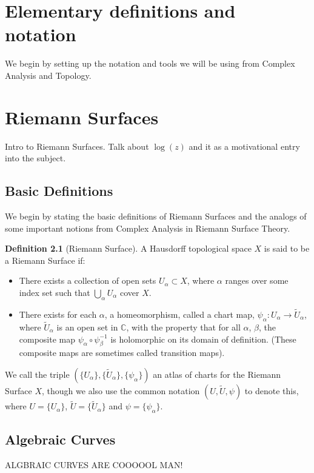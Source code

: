 \documentclass[11pt]{report}
\theoremstyle{definition}
\newtheorem{defn}[thm]{Definition}
\begin{document}
\chapter{Elementary definitions and notation}
We begin by setting up the notation and tools we will be using from Complex Analysis and Topology.

\chapter{Riemann Surfaces}

Intro to Riemann Surfaces. Talk about $\log(z)$ and it as a motivational entry into the subject.


\section{Basic Definitions}\label{bdefns}

We begin by stating the basic definitions of Riemann Surfaces and the 
analogs of some important notions from Complex Analysis in Riemann Surface
Theory.

\begin{defn}[Riemann Surface]\label{rsdefn}
A Hausdorff topological space $X$ is said to be a Riemann Surface if:
\begin{itemize}
\item There exists a collection of open sets $U_{\alpha} \subset X$, where
  $
\alpha$ 
ranges over some index set such that $\bigcup\limits_{\alpha} U_{\alpha}$
cover 
$X$.
\item There exists for each $\alpha$, a homeomorphism, called a chart map,
  $ \psi_{\alpha}\colon U_{\alpha} \rightarrow \tilde{U}_{\alpha}$, where
$\tilde{U}_{\alpha}$ is 
  an open set in $\mathbb{C}$, with the property that for all $\alpha$,
  $\beta$, the composite map $\psi_{\alpha} \circ \psi_{\beta}^{-1}$ is
  holomorphic on its 
domain of 
definition. (These composite maps are sometimes called transition maps).
\end{itemize}
We call the triple $(\{U_\alpha\},\{\tilde{U}_{\alpha}\},
\{\psi_\alpha\})$ an 
atlas of 
charts for the Riemann Surface $X$, though we also use the common
notation $(U,
\tilde{U}, \psi)$ to denote this, where $U=\{U_\alpha\}$,
$\tilde{U}=\{\tilde{U}
_{\alpha}\}$ and $\psi=\{\psi_\alpha\}$.
\end{defn}


\section{Algebraic Curves}\label{algcurv}
ALGBRAIC CURVES ARE COOOOOL MAN!
\end{document}
